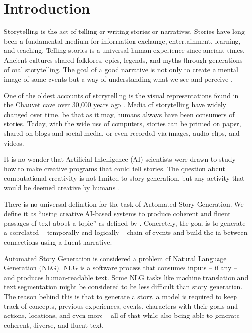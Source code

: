 \chapter{Introduction}
\label{ch:introduction}



Storytelling is the act of telling or writing stories or narratives. Stories have long been a fundamental medium for information exchange, entertainment, learning, and teaching. Telling stories is a universal human experience since ancient times. Ancient cultures shared folklores, epics, legends, and myths through generations of oral storytelling. The goal of a good narrative is not only to create a mental image of some events but a way of understanding what we see and perceive \citep{welsch1998history}.

One of the oldest accounts of storytelling is the visual representations found in the Chauvet cave over 30,000 years ago \citep{clottes2003chauvet}. Media of storytelling have widely changed over time, be that as it may, humans always have been consumers of stories. Today, with the wide use of computers, stories can be printed on paper, shared on blogs and social media, or even recorded via images, audio clips, and videos.

It is no wonder that Artificial Intelligence (AI) scientists were drawn to study how to make creative programs that could tell stories. The question about computational creativity is not limited to story generation, but any activity that would be deemed creative by humans \citep{colton2009computational}.

There is no universal definition for the task of Automated Story Generation. We define it as ``using creative AI-based systems to produce coherent and fluent passages of text about a topic'' as defined by \citep{fan2018hierarchical}. Concretely, the goal is to generate a correlated -- temporally and logically -- chain of events and build the in-between connections using a fluent narrative.

Automated Story Generation is considered a problem of Natural Language Generation (NLG). NLG is a software process that consumes inputs -- if any -- and produces human-readable text. Some NLG tasks like machine translation and text segmentation might be considered to be less difficult than story generation. The reason behind this is that to generate a story, a model is required to keep track of concepts, previous experiences, events, characters with their goals and actions, locations, and even more -- all of that while also being able to generate coherent, diverse, and fluent text.


